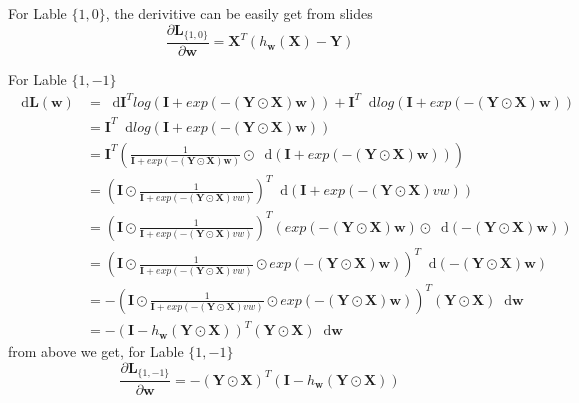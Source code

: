 \documentclass[11pt]{article}
\newcommand{\mtx}[1]{\mathbf{#1}}
\newcommand{\vct}[1]{\mathbf{#1}}
\def \mI {\mtx{I}}
\def \mL {\mtx{L}}
\def \mX {\mtx{X}}
\def \mY {\mtx{Y}}
\def \vw {\vct{w}}
\def\dif{\mathop{}\!\mathrm{d}}
\begin{document}
\begin{enumerate}
\begin{enumerate}
		For Lable $\{1,0\}$, the derivitive can be easily get from slides
		\begin{equation}
			\frac{\partial \mL_{\{1,0\}}}{\partial \vw} = \mX^T(h_{\vw}(\mX)-\mY)
		\end{equation}
 
		For Lable $\{1,-1\}$
		\begin{align*}
			\dif\mL(\vw) &= \dif\mI^T log(\mI+exp(-(\mY\odot\mX)\vw )) + \mI^T \dif log(\mI+exp(-(\mY\odot\mX)\vw ))\\
					&= \mI^T \dif log(\mI+exp(-(\mY\odot\mX)\vw ))\\
					& = \mI^T\left( \frac{1}{\mI+exp(-(\mY\odot\mX)\vw )}\odot \dif \left(\mI+exp(-(\mY\odot\mX)\vw)\right)\right)\\
					& = \left( \mI\odot \frac{1}{\mI+exp(-(\mY\odot\mX)vw )} \right)^T\dif(\mI+exp(-(\mY\odot\mX)vw ))\\
					& = \left( \mI\odot \frac{1}{\mI+exp(-(\mY\odot\mX)vw )} \right)^T \left( exp(-(\mY\odot\mX)\vw)\odot\dif (-(\mY\odot\mX)\vw ) \right)\\
					& = \left( \mI\odot \frac{1}{\mI+exp(-(\mY\odot\mX)vw )}\odot exp(-(\mY\odot\mX)\vw)\right)^T\dif (-(\mY\odot\mX)\vw )\\
					& = - \left( \mI\odot \frac{1}{\mI+exp(-(\mY\odot\mX)vw )}\odot exp(-(\mY\odot\mX)\vw)\right)^T(\mY\odot\mX)\dif \vw \\
					& = - \left(\mI-h_{\vw}\left(\mY\odot\mX\right)\right)^T(\mY\odot\mX)\dif\vw
		\end{align*}
		from above we get, for Lable $\{1,-1\}$
		\begin{equation}
			\frac{\partial \mL_{\{1,-1\}}}{\partial \vw} = - (\mY\odot\mX)^T \left(\mI-h_{\vw}\left(\mY\odot\mX\right)\right)
		\end{equation}


\end{enumerate}
\end{enumerate}
\end{document}
